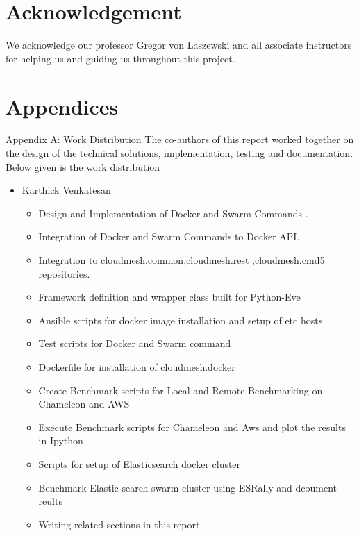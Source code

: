 \documentclass[9pt,twocolumn,twoside]{../../styles/osajnl}
\begin{document}
\section{Acknowledgement}

We acknowledge our professor Gregor von Laszewski and all associate instructors for helping us and guiding us throughout this project.

\section{Appendices}
Appendix A: Work Distribution
The co-authors of this report worked together on the design of the technical
solutions, implementation, testing and documentation. Below given is the work
 distribution
\begin{itemize}
\item Karthick Venkatesan
    \begin{itemize}
    \item Design and Implementation of Docker and Swarm Commands .
    \item Integration of Docker and Swarm Commands to Docker API.
    \item Integration to cloudmesh.common,cloudmesh.rest ,cloudmesh.cmd5 repositories.
    \item Framework definition and wrapper class built for Python-Eve
    \item Ansible scripts for docker image installation  and setup of etc hosts
    \item Test scripts for Docker and Swarm command
    \item Dockerfile for installation of cloudmesh.docker
    \item Create Benchmark scripts for Local and Remote Benchmarking on Chameleon and AWS
    \item Execute Benchmark scripts for Chameleon and Aws and plot the results in Ipython
    \item Scripts for setup of Elasticsearch docker cluster
    \item Benchmark Elastic search swarm  cluster using ESRally and dcoument reults
    \item Writing related sections in this report.
    \end{itemize}


\end{itemize}
\end{document}
